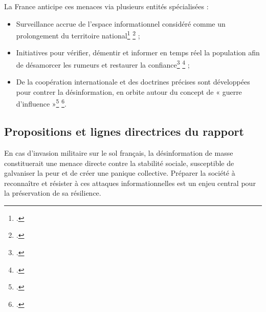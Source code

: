 \documentclass[12pt,a4paper]{article}
\begin{document}
La France anticipe ces menaces via plusieurs entités spécialisées :

\begin{itemize}
\item Surveillance accrue de l'espace informationnel considéré comme un prolongement du territoire national\footcite{rdn2020desinformation} \footcite{garrigou2025desinformation} ;
\item Initiatives pour vérifier, démentir et informer en temps réel la population afin de désamorcer les rumeurs et restaurer la confiance\footcite{garrigou2025desinformation} \footcite{ministere2025infox} ;\\
\item De la coopération internationale et des doctrines précises sont développées pour contrer la désinformation, en orbite autour du concept de « guerre d'influence »\footcite{ministere2025infox} \footcite{rdn2020desinformation}.
\end{itemize}

\subsection{Propositions et lignes directrices du rapport}

En cas d'invasion militaire sur le sol français, la désinformation de masse constituerait une menace directe contre la stabilité sociale, susceptible de galvaniser la peur et de créer une panique collective. Préparer la société à reconnaître et résister à ces attaques informationnelles est un enjeu central pour la préservation de sa résilience.

\newpage

\printbibliography[heading=bibintoc,title={Références bibliographiques}]
\end{document}
